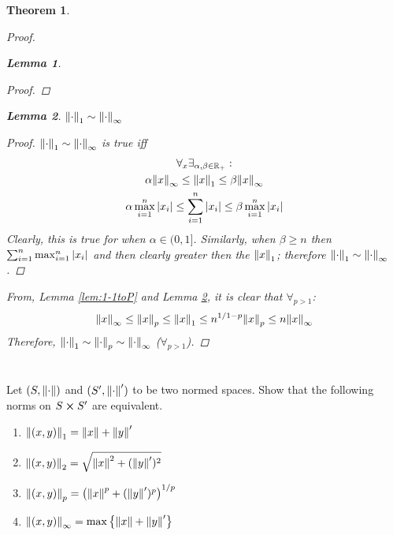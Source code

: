 \documentclass[]{article}
\newcommand{\R}{\mathbb{R}}
\newtheorem{theorem}{Theorem}
\newtheorem{lemma}{Lemma}
\begin{document}
\begin{theorem}
\begin{proof}
\begin{lemma}
\begin{proof}
            \end{proof}
        \end{lemma}
        \begin{lemma}\label{lem:1-1toInfty}
            $\norm{\cdot}_1 \sim \norm{\cdot}_\infty$
            \begin{proof}
                $\norm{\cdot}_1 \sim \norm{\cdot}_\infty$ is true iff
                \begin{multline*} 
                    \forall_{x} \exists_{\alpha,\beta \in \R_+} :\\
                    \alpha \norm{x}_\infty \leq \norm{x}_1 \leq \beta \norm{x}_\infty\\
                    \alpha \max_{i=1}^n \abs{x_i} \leq \sum_{i=1}^n \abs{x_i} \leq \beta \max_{i=1}^n \abs{x_i}\\
                \end{multline*}
                Clearly, this is true for when $\alpha \in (0,1]$. Similarly, when $\beta \geq n$ then $\sum_{i=1}^n \max_{i=1}^n \abs{x_i}$ and then clearly greater then the $\norm{x}_1$; therefore $\norm{\cdot}_1 \sim \norm{\cdot}_\infty$.
            \end{proof}
        \end{lemma}
        From, Lemma \ref{lem:1-1toP} and Lemma \ref{lem:1-1toInfty}, it is clear that $\forall_{p > 1}$:
        \[
            \norm{x}_\infty 
            \leq \norm{x}_p 
            \leq \norm{x}_1 
            \leq n^{1/{1-p}} \norm{x}_p 
            \leq n \norm{x}_\infty
        \]
        Therefore, $\norm{\cdot}_1 \sim \norm{\cdot}_p \sim \norm{\cdot}_\infty$ ($\forall_{p > 1}$).
    \end{proof}
\end{theorem}

\newpage
\section{}
Let $(S, \norm{\cdot})$ and $(S', \norm{\cdot}')$ to be two normed spaces. 
Show that the following norms on $S \cross S'$ are equivalent.
\begin{enumerate}
    \item $\norm{(x,y)}_1 = \norm{x} + \norm{y}'$
    \item $\norm{(x,y)}_2 = \sqrt{\norm{x}^2 + (\norm{y}')^2}$
    \item $\norm{(x,y)}_p = \qty(\norm{x}^p + (\norm{y}')^p)^{1/p}$
    \item $\norm{(x,y)}_\infty = \max\qty{\norm{x} + \norm{y}'}$
\end{enumerate}
\end{document}
